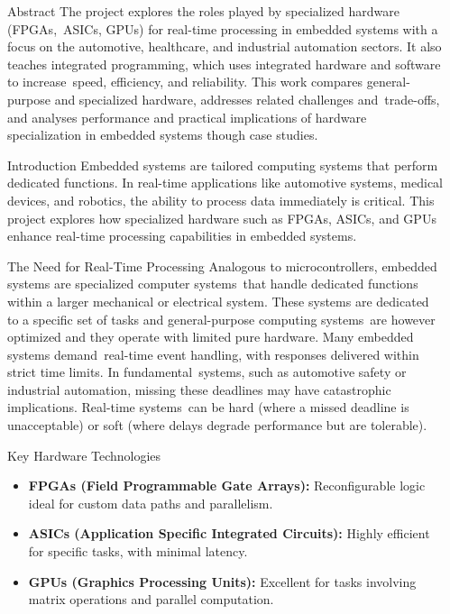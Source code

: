 \documentclass[final]{beamer}
\newlength{\sepwidth}
\newlength{\colwidth}
\newcommand{\separatorcolumn}{\begin{column}{\sepwidth}\end{column}}
\begin{document}
\begin{frame}[t]
\begin{columns}[t]
\separatorcolumn

\begin{column}{\colwidth}

\begin{block}{Abstract}
   The project explores the roles played by specialized hardware (FPGAs, ASICs, GPUs) for real-time processing in embedded systems with a focus on the automotive, healthcare, and industrial automation sectors. It also teaches integrated programming, which uses integrated hardware and software to increase speed, efficiency, and reliability. This work compares general-purpose and specialized hardware, addresses related challenges and trade-offs, and analyses performance and practical implications of hardware specialization in embedded systems though case studies.
  \end{block}



  \begin{block}{Introduction}
    Embedded systems are tailored computing systems that perform dedicated functions. In real-time applications like automotive systems, medical devices, and robotics, the ability to process data immediately is critical. This project explores how specialized hardware such as FPGAs, ASICs, and GPUs enhance real-time processing capabilities in embedded systems.
  \end{block}

  \begin{block}{The Need for Real-Time Processing}
   Analogous to microcontrollers, embedded systems are specialized computer systems that handle dedicated functions within a larger mechanical or electrical system. These systems are dedicated to a specific set of tasks and general-purpose computing systems are however optimized and they operate with limited pure hardware. Many embedded systems demand real-time event handling, with responses delivered within strict time limits. In fundamental systems, such as automotive safety or industrial automation, missing these deadlines may have catastrophic implications. Real-time systems can be hard (where a missed deadline is unacceptable) or soft (where delays degrade performance but are tolerable).
  \end{block}
  
 \begin{alertblock}{Key Hardware Technologies}
    \begin{itemize}
      \item \textbf{FPGAs (Field Programmable Gate Arrays):} Reconfigurable logic ideal for custom data paths and parallelism.
      \item \textbf{ASICs (Application Specific Integrated Circuits):} Highly efficient for specific tasks, with minimal latency.
      \item \textbf{GPUs (Graphics Processing Units):} Excellent for tasks involving matrix operations and parallel computation.
    \end{itemize}
  \end{alertblock}
  

\end{column}
\end{columns}
\end{frame}
\end{document}
